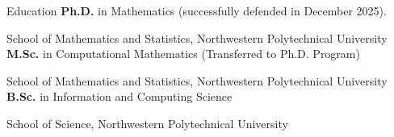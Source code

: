 \begin{rubric}{Education}
\entry*[2019 -- 2025]%
	\textbf{Ph.D. } in Mathematics (successfully defended in December 2025).
	\par School of Mathematics and Statistics, Northwestern Polytechnical University
%
\entry*[2018 -- 2019]%
	\textbf{M.Sc.} in Computational Mathematics (Transferred to Ph.D. Program) 
	\par School of Mathematics and Statistics, Northwestern Polytechnical University
\entry*[2014 -- 2018]%
	\textbf{B.Sc.} in Information and Computing Science
	\par School of Science, Northwestern Polytechnical University
	
\end{rubric}